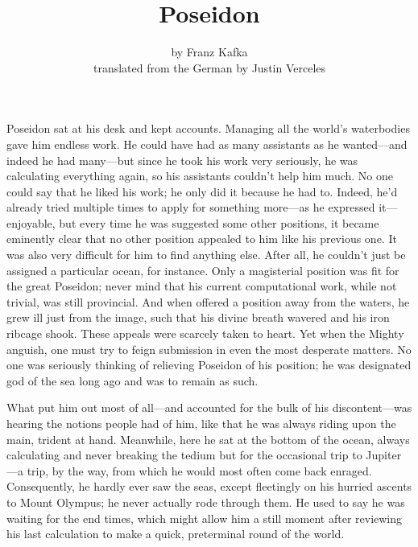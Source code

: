\documentclass[12pt,a4paper]{article}
\title{Poseidon}
\author{by Franz Kafka\\translated from the German by Justin Verceles}
\date{}
\begin{document}
\maketitle
Poseidon sat at his desk and kept accounts. Managing all the world’s waterbodies gave him endless work. He could have had as many assistants as he wanted—and indeed he had many—but since he took his work very seriously, he was calculating everything again, so his assistants couldn’t help him much. No one could say that he liked his work; he only did it because he had to. Indeed, he’d already tried multiple times to apply for something more—as he expressed it—enjoyable, but every time he was suggested some other positions, it became eminently clear that no other position appealed to him like his previous one. It was also very difficult for him to find anything else. After all, he couldn’t just be assigned a particular ocean, for instance. Only a magisterial position was fit for the great Poseidon; never mind that his current computational work, while not trivial, was still provincial. And when offered a position away from the waters, he grew ill just from the image, such that his divine breath wavered and his iron ribcage shook. These appeals were scarcely taken to heart. Yet when the Mighty anguish, one must try to feign submission in even the most desperate matters. No one was seriously thinking of relieving Poseidon of his position; he was designated god of the sea long ago and was to remain as such.

What put him out most of all—and accounted for the bulk of his discontent—was hearing the notions people had of him, like that he was always riding upon the main, trident at hand. Meanwhile, here he sat at the bottom of the ocean, always calculating and never breaking the tedium but for the occasional trip to Jupiter—a trip, by the way, from which he would most often come back enraged. Consequently, he hardly ever saw the seas, except fleetingly on his hurried ascents to Mount Olympus; he never actually rode through them. He used to say he was waiting for the end times, which might allow him a still moment after reviewing his last calculation to make a quick, preterminal round of the world. 
\end{document}
